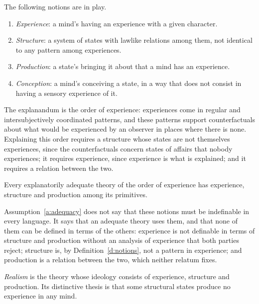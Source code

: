 \documentclass{situationist-preprint}
\begin{document}
\begin{definition}\label{d:notions}
The following notions are in play.
\begin{enumerate}[label=(\alph*)]
\item \emph{Experience}: a mind's having an experience with a given character.
\item \emph{Structure}: a system of states with lawlike relations among them, not identical to any pattern among experiences.
\item \emph{Production}: a state's bringing it about that a mind has an experience.
\item \emph{Conception}: a mind's conceiving a state, in a way that does not consist in having a sensory experience of it.
\end{enumerate}
\end{definition}

The explanandum is the order of experience: experiences come in regular and intersubjectively coordinated patterns, and these patterns support counterfactuals about what would be experienced by an observer in places where there is none. Explaining this order requires a structure whose states are not themselves experiences, since the counterfactuals concern states of affairs that nobody experiences; it requires experience, since experience is what is explained; and it requires a relation between the two.

\begin{assumption}[Adequacy]\label{a:adequacy}
Every explanatorily adequate theory of the order of experience has experience, structure and production among its primitives.
\end{assumption}

Assumption~\ref{a:adequacy} does not say that these notions must be indefinable in every language. It says that an adequate theory uses them, and that none of them can be defined in terms of the others: experience is not definable in terms of structure and production without an analysis of experience that both parties reject; structure is, by Definition~\ref{d:notions}, not a pattern in experience; and production is a relation between the two, which neither relatum fixes.

\begin{definition}[Realism]\label{d:realism}
\emph{Realism} is the theory whose ideology consists of experience, structure and production. Its distinctive thesis is that some structural states produce no experience in any mind.
\end{definition}
\end{document}

